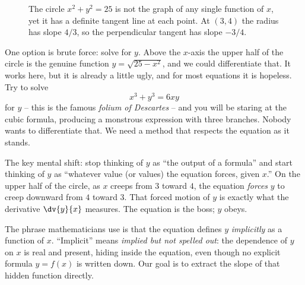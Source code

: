 \begin{figure}[H]
\centering
{}
\caption{The circle $x^2+y^2=25$ is not the graph of any single function of $x$, yet it has a
definite tangent line at each point. At $(3,4)$ the radius has slope $4/3$, so the perpendicular
tangent has slope $-3/4$.}
\label{ch13:fig-circle}
\end{figure}

One option is brute force: solve for $y$. Above the $x$-axis the upper half of the circle is the
genuine function $y = \sqrt{25 - x^2}$, and we could differentiate that. It works here, but it is
already a little ugly, and for most equations it is hopeless. Try to solve
\[
x^3 + y^3 = 6xy
\]
for $y$ -- this is the famous \emph{folium of Descartes} -- and you will be staring at the cubic
formula, producing a monstrous expression with three branches. Nobody wants to differentiate that.
We need a method that respects the equation as it stands.

\begin{intuitionbox}
The key mental shift: stop thinking of $y$ as ``the output of a formula'' and start thinking of $y$
as ``whatever value (or values) the equation forces, given $x$.'' On the upper half of the circle,
as $x$ creeps from $3$ toward $4$, the equation \emph{forces} $y$ to creep downward from $4$ toward
$3$. That forced motion of $y$ is exactly what the derivative $\dv{y}{x}$ measures. The equation is
the boss; $y$ obeys.
\end{intuitionbox}

The phrase mathematicians use is that the equation defines $y$ \emph{implicitly} as a function of
$x$. ``Implicit'' means \emph{implied but not spelled out}: the dependence of $y$ on $x$ is real and
present, hiding inside the equation, even though no explicit formula $y=f(x)$ is written down. Our
goal is to extract the slope of that hidden function directly.


